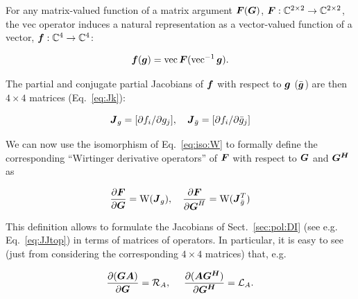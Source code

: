 \documentclass[useAMS,usenatbib]{mn2e}
\newcommand{\COMPLEX}{\mathbb{C}}
\newcommand{\mat}[1]{{\bmath{#1}}}
\newcommand{\JJ}{\mat{J}} %
\begin{document}
For any matrix-valued function of a matrix argument $\mat{F}(\mat{G})$, $\mat{F}:\COMPLEX^{2\times2}\to\COMPLEX^{2\times2}$,
the $\mathrm{vec}$ operator induces a natural representation as a vector-valued function of a 
vector, $\bmath{f}:\COMPLEX^4\to\COMPLEX^4$:

\[
\bmath{f}(\bmath{g}) = \VEC{\mat{F}(\VECINV{\bmath{g}})}.
\]

The partial and conjugate partial Jacobians of $\bmath{f}$ with respect to $\bmath{g}$ ($\bar{\bmath{g}}$) are then $4\times4$ matrices (Eq.~\ref{eq:Jk}):

\[
\JJ_g = [ \partial f_i / \partial g_j ],~~~\JJ_{\bar{g}} = [ \partial f_i / \partial \bar{g}_j ]
\]

We can now use the isomorphism of Eq.~\ref{eq:iso:W} to formally define the corresponding ``Wirtinger derivative operators'' 
of $\mat{F}$ with respect to $\mat{G}$ and $\mat{G^H}$ as

\begin{equation}
\label{eq:def:dF:dG}
\frac{\partial\mat{F}}{\partial{\mat{G}}} = \mathrm{W}(\JJ_g),~~~
\frac{\partial\mat{F}}{\partial{\mat{G}^H}} = \mathrm{W}(\JJ_{\bar{g}}^T)
\end{equation}

This definition allows to formulate the Jacobians of Sect.~\ref{sec:pol:DI} (see e.g. Eq.~\ref{eq:JJtop}) 
in terms of matrices of operators. In particular, it is easy to see (just from considering the corresponding $4\times4$ matrices) that, e.g.

\[
\frac{\partial(\mat{GA})}{\partial{\mat{G}}} = \Rop{A},~~~~\frac{\partial(\mat{AG^H})}{\partial{\mat{G^H}}} = \Lop{A}.
\]




\end{document}
